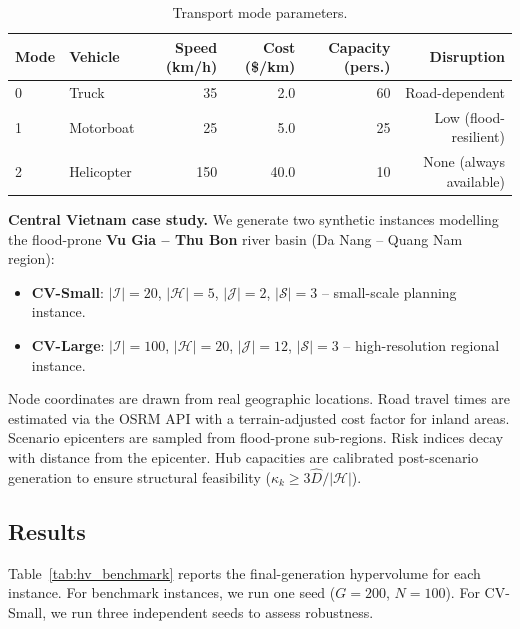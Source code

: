 \documentclass{llncs}
\begin{document}
\begin{table}[ht]
\centering
\caption{Transport mode parameters.}
\label{tab:modes}
\begin{tabular}{llrrrr}
\toprule
Mode & Vehicle & Speed (km/h) & Cost (\$/km) & Capacity (pers.) & Disruption \\
\midrule
0 & Truck       & 35  & 2.0  & 60 & Road-dependent \\
1 & Motorboat   & 25  & 5.0  & 25 & Low (flood-resilient) \\
2 & Helicopter  & 150 & 40.0 & 10 & None (always available) \\
\bottomrule
\end{tabular}
\end{table}

\textbf{Central Vietnam case study.} We generate two synthetic instances modelling the flood-prone \textbf{Vu Gia -- Thu Bon} river basin (Da Nang -- Quang Nam region):
\begin{itemize}
    \item \textbf{CV-Small}: $|\mathcal{I}|=20$, $|\mathcal{H}|=5$, $|\mathcal{J}|=2$, $|\mathcal{S}|=3$ -- small-scale planning instance.
    \item \textbf{CV-Large}: $|\mathcal{I}|=100$, $|\mathcal{H}|=20$, $|\mathcal{J}|=12$, $|\mathcal{S}|=3$ -- high-resolution regional instance.
\end{itemize}
Node coordinates are drawn from real geographic locations. Road travel times are estimated via the OSRM API with a terrain-adjusted cost factor for inland areas. Scenario epicenters are sampled from flood-prone sub-regions. Risk indices decay with distance from the epicenter. Hub capacities are calibrated post-scenario generation to ensure structural feasibility ($\kappa_k \ge 3\hat{D}/|\mathcal{H}|$).

\subsection{Results}

Table~\ref{tab:hv_benchmark} reports the final-generation hypervolume for each instance. For benchmark instances, we run one seed ($G=200$, $N=100$). For CV-Small, we run three independent seeds to assess robustness.
\end{document}

